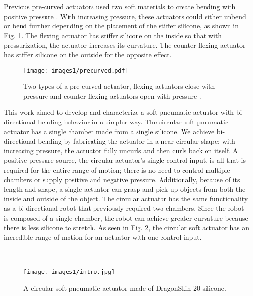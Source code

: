 Previous pre-curved actuators used two soft materials to create bending with positive pressure \cite{hu_precurved_2022}. With increasing pressure, these actuators could either unbend or bend further depending on the placement of the stiffer silicone, as shown in Fig. \ref{fig:precurved}. The flexing actuator has stiffer silicone on the inside so that with pressurization, the actuator increases its curvature. The counter-flexing actuator has stiffer silicone on the outside for the opposite effect. \\

\begin{figure}[!ht]
    \centering
    \texttt{[image: images1/precurved.pdf]}
    \caption{Two types of a pre-curved actuator, flexing actuators close with pressure and counter-flexing actuators open with pressure \cite{hu_precurved_2022}.}
    \label{fig:precurved}
\end{figure}

This work aimed to develop and characterize a soft pneumatic actuator with bi-directional bending behavior in a simpler way. The circular soft pneumatic actuator has a single chamber made from a single silicone. We achieve bi-directional bending by fabricating the actuator in a near-circular shape: with increasing pressure, the actuator fully uncurls and then curls back on itself. A positive pressure source, the circular actuator's single control input, is all that is required for the entire range of motion; there is no need to control multiple chambers or supply positive and negative pressure. Additionally, because of its length and shape, a single actuator can grasp and pick up objects from both the inside and outside of the object. The circular actuator has the same functionality as a bi-directional robot that previously required two chambers. Since the robot is composed of a single chamber, the robot can achieve greater curvature because there is less silicone to stretch. As seen in Fig. \ref{fig:intro}, the circular soft actuator has an incredible range of motion for an actuator with one control input. \\ \\ \\

\begin{figure}[!ht]
    \centering
    \texttt{[image: images1/intro.jpg]}
    \caption{A circular soft pneumatic actuator made of DragonSkin 20 silicone.}
    \label{fig:intro}
\end{figure}

